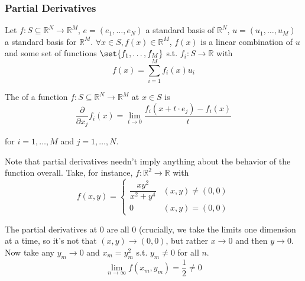 \documentclass{article}
\begin{document}
\subsubsection{Partial Derivatives}
\label{ssub:partial_derivatives}

\begin{definition}
  Let $f: S \subseteq \mathbb{R}^N \to \mathbb{R}^M$, $e = (e_1, \ldots, e_N)$ a standard basis of $\mathbb{R}^N$, $u = (u_1, \ldots, u_M)$ a standard basis for $\mathbb{R}^M$. $\forall x \in S, f(x) \in \mathbb{R}^M$, $f(x)$ is a linear combination of $u$ and some set of functions $\set{f_1, \ldots, f_M}$ s.t. $f_i: S \to \mathbb{R}$ with
  \[
    f(x) = \sum^{M}_{i = 1} f_i(x) u_i
  \]
\end{definition}

\begin{definition}
  The  of a function $f: S \subseteq \mathbb{R}^N \to \mathbb{R}^M$ at $x \in S$ is
  \[
    \dfrac{\partial}{\partial x_j} f_i(x) = \lim_{t \to 0} \dfrac{f_i(x + t \cdot e_j) - f_i(x)}{t}
  \]

  for $i = 1, \ldots, M$ and $j = 1, \ldots, N$.
\end{definition}

%

Note that partial derivatives needn't imply anything about the behavior of the function overall. Take, for instance, $f: \mathbb{R}^2 \to \mathbb{R}$ with
\[
  f(x, y) =
  \begin{cases}
    \dfrac{xy^2}{x^2 + y^4} & (x, y) \ne (0, 0) \\
    0 & (x, y) = (0, 0)
  \end{cases}
\]

The partial derivatives at $0$ are all $0$ (crucially, we take the limits one dimension at a time, so it's not that $(x, y) \to (0, 0)$, but rather $x \to 0$ and then $y \to 0$. Now take any $y_m \to 0$ and $x_m = y_m^2$ s.t. $y_m \ne 0$ for all $n$.
\[
  \lim_{n \to \infty} f(x_m, y_m) = \dfrac{1}{2} \ne 0
\]
\end{document}
